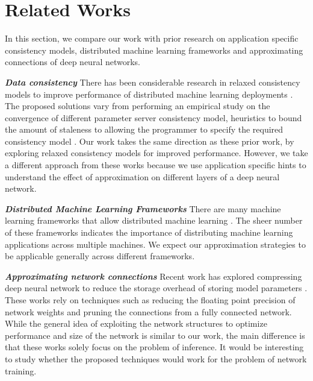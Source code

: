 \section{Related Works}

In this section, we compare our work with prior research
on application specific consistency models, distributed
machine learning frameworks and approximating connections 
of deep neural networks.

\emph{\textbf{Data consistency}} There has been considerable
research in relaxed consistency models to improve performance
of distributed machine learning deployments \cite{ganger}\cite{stalesynchronousps}\cite{garth}\cite{parameterserver}.
The proposed solutions vary from performing an empirical study on the 
convergence of different parameter server consistency model\cite{garth}, 
heuristics to bound the amount of staleness \cite{ganger} to 
allowing the programmer to specify the required consistency model \cite{parameterserver}.
Our work takes the same direction as these prior work, by exploring
relaxed consistency models for improved performance. However, we take
a different approach from these works because we use application specific
hints to understand the effect of approximation on different layers of a 
deep neural network.

\emph{\textbf{Distributed Machine Learning Frameworks}} There are many
machine learning frameworks that allow distributed machine learning \cite{tensorflow}
\cite{parameterserver}\cite{distbelief}\cite{petuum}\cite{mxnet}. The sheer number
of these frameworks indicates the importance of distributing machine learning
applications across multiple machines. We expect our approximation strategies
to be applicable generally across different frameworks.

\emph{\textbf{Approximating network connections}} Recent work has explored 
compressing deep neural network to reduce the storage overhead of storing 
model parameters \cite{compresseddnn}\cite{eie}\cite{compressedcnn}\cite{lecun}. These works rely on techniques
such as reducing the floating point precision of network weights and pruning
the connections from a fully connected network. While the general idea of 
exploiting the network structures to optimize performance and size of the network
is similar to our work, the main difference is that these works solely focus on 
the problem of inference. It would be interesting to study whether the proposed
techniques would work for the problem of network training.

 



